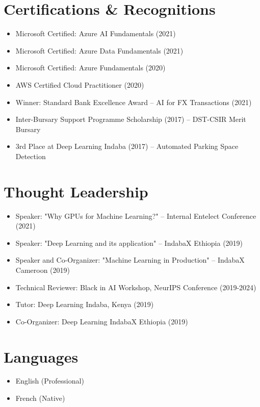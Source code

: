 \documentclass[a4paper,10pt]{article}
\begin{document}
\section{Certifications \& Recognitions}
\begin{itemize}[noitemsep,topsep=0pt]
    \item Microsoft Certified: Azure AI Fundamentals (2021)
    \item Microsoft Certified: Azure Data Fundamentals (2021)
    \item Microsoft Certified: Azure Fundamentals (2020)
    \item AWS Certified Cloud Practitioner (2020)
    \item Winner: Standard Bank Excellence Award – AI for FX Transactions (2021)
    \item Inter-Bursary Support Programme Scholarship (2017) – DST-CSIR Merit Bursary
    \item 3rd Place at Deep Learning Indaba (2017) – Automated Parking Space Detection
\end{itemize}

\section{Thought Leadership}
\begin{itemize}[noitemsep,topsep=0pt]
    \item Speaker: "Why GPUs for Machine Learning?" – Internal Entelect Conference (2021)
    \item Speaker: "Deep Learning and its application" – IndabaX Ethiopia (2019)
    \item Speaker and Co-Organizer: "Machine Learning in Production" – IndabaX Cameroon (2019)
    \item Technical Reviewer: Black in AI Workshop, NeurIPS Conference (2019-2024)
    \item Tutor: Deep Learning Indaba, Kenya (2019)
    \item Co-Organizer: Deep Learning IndabaX Ethiopia (2019)
\end{itemize}

\section{Languages}
\begin{itemize}[noitemsep,topsep=0pt]
    \item English (Professional)
    \item French (Native)
\end{itemize}
\end{document}
